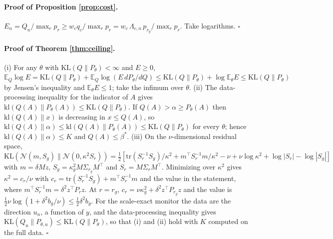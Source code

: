\documentclass[11pt]{article}
\theoremstyle{plain}
\theoremstyle{definition}
\newcommand{\E}{\mathbb{E}}
\begin{document}
\paragraph{Proof of Proposition \ref{prop:cost}.} $E_n = Q_n/\max_rp_r \ge w_cq_c/\max_rp_r = w_c\,\Lambda_{c,n}\,p_{r_g}/\max_rp_r$. Take logarithms. $\square$

\paragraph{Proof of Theorem \ref{thm:ceiling}.} (i) For any $\theta$ with $\mathrm{KL}(Q\|P_\theta)<\infty$ and $E\ge0$, $\E_Q\log E=\mathrm{KL}(Q\|P_\theta)+\E_Q\log(E\,dP_\theta/dQ)\le\mathrm{KL}(Q\|P_\theta)+\log\E_\theta E\le\mathrm{KL}(Q\|P_\theta)$ by Jensen's inequality and $\E_\theta E\le1$; take the infimum over $\theta$. (ii) The data-processing inequality for the indicator of $A$ gives $\mathrm{kl}(Q(A)\|P_\theta(A))\le\mathrm{KL}(Q\|P_\theta)$. If $Q(A)>\alpha\ge P_\theta(A)$ then $\mathrm{kl}(Q(A)\|x)$ is decreasing in $x\le Q(A)$, so $\mathrm{kl}(Q(A)\|\alpha)\le\mathrm{kl}(Q(A)\|P_\theta(A))\le\mathrm{KL}(Q\|P_\theta)$ for every $\theta$; hence $\mathrm{kl}(Q(A)\|\alpha)\le K$ and $Q(A)\le\beta^*$. (iii) On the $\nu$-dimensional residual space, $\mathrm{KL}(\mathcal{N}(m,S_g)\|\mathcal{N}(0,\kappa^2S_r))=\tfrac12[\mathrm{tr}(S_r^{-1}S_g)/\kappa^2+m^\top S_r^{-1}m/\kappa^2-\nu+\nu\log\kappa^2+\log|S_r|-\log|S_g|]$ with $m=\delta Mz$, $S_g=\kappa_g^2M\Sigma_{r_g}M^\top$ and $S_r=M\Sigma_rM^\top$. Minimizing over $\kappa^2$ gives $\kappa^2=c_r/\nu$ with $c_r=\mathrm{tr}(S_r^{-1}S_g)+m^\top S_r^{-1}m$ and the value in the statement, where $m^\top S_r^{-1}m=\delta^2z^\top P_rz$. At $r=r_g$, $c_r=\nu\kappa_g^2+\delta^2z^\top P_{r_g}z$ and the value is $\tfrac12\nu\log(1+\delta^2b_g/\nu)\le\tfrac12\delta^2b_g$. For the scale-exact monitor the data are the direction $u_n$, a function of $y$, and the data-processing inequality gives $\mathrm{KL}(Q_{u}\|P_{\theta,u})\le\mathrm{KL}(Q\|P_\theta)$, so that (i) and (ii) hold with $K$ computed on the full data. $\square$
\end{document}
